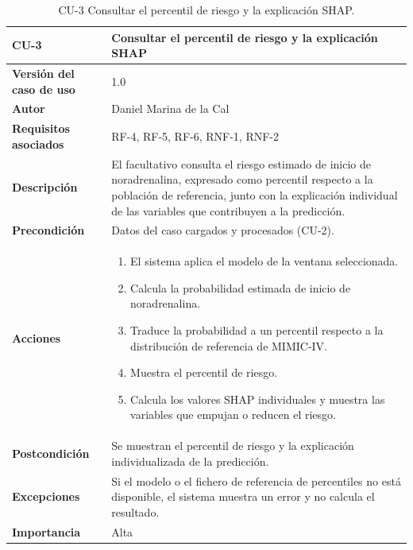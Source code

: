 \documentclass[
  spanish,
  a4paper,
  12pt,
  twoside]{memoir}
\providecommand{\tightlist}{%
  \setlength{\itemsep}{0pt}\setlength{\parskip}{0pt}}
\begin{document}
\begin{table}[p]
    \centering
    \begin{tabularx}{\linewidth}{ p{} p{} }
        \toprule
        \textbf{CU-3} & \textbf{Consultar el percentil de riesgo y la explicación SHAP}\\
        \toprule
        \textbf{Versión del caso de uso} & 1.0 \\
        \textbf{Autor} & Daniel Marina de la Cal \\
        \textbf{Requisitos asociados} & RF-4, RF-5, RF-6, RNF-1, RNF-2 \\
        \textbf{Descripción} & El facultativo consulta el riesgo estimado de inicio de noradrenalina, expresado como percentil respecto a la población de referencia, junto con la explicación individual de las variables que contribuyen a la predicción. \\
        \textbf{Precondición} & Datos del caso cargados y procesados (CU-2). \\
        \textbf{Acciones} &
        \begin{enumerate}
            \def\labelenumi{\arabic{enumi}.}
            \tightlist
            \item El sistema aplica el modelo de la ventana seleccionada.
            \item Calcula la probabilidad estimada de inicio de noradrenalina.
            \item Traduce la probabilidad a un percentil respecto a la distribución de referencia de MIMIC-IV.
            \item Muestra el percentil de riesgo.
            \item Calcula los valores SHAP individuales y muestra las variables que empujan o reducen el riesgo.
        \end{enumerate}\\
        \textbf{Postcondición} & Se muestran el percentil de riesgo y la explicación individualizada de la predicción. \\
        \textbf{Excepciones} & Si el modelo o el fichero de referencia de percentiles no está disponible, el sistema muestra un error y no calcula el resultado. \\
        \textbf{Importancia} & Alta \\
        \bottomrule
    \end{tabularx}
    \caption{CU-3 Consultar el percentil de riesgo y la explicación SHAP.}
\end{table}
\end{document}
